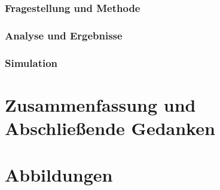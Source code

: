 \documentclass[openany,twoside,twocolumn]{book}
\let\pby\printbibliography
\renewcommand{\printbibliography}{}
\begin{document}
\hypertarget{fragestellung-und-methode-1}{%
\subsection{Fragestellung und
Methode}\label{fragestellung-und-methode-1}}

\hypertarget{analyse-und-ergebnisse-1}{%
\subsection{Analyse und Ergebnisse}\label{analyse-und-ergebnisse-1}}

\hypertarget{simulation-2}{%
\subsection{Simulation}\label{simulation-2}}

\pby[title={Literatur},segment=\therefsegment,heading=subbibintoc]

\hypertarget{zusammenfassung-und-abschlieende-gedanken}{%
\chapter{Zusammenfassung und Abschließende
Gedanken}\label{zusammenfassung-und-abschlieende-gedanken}}

\hypertarget{abbildungen}{%
\chapter{Abbildungen}\label{abbildungen}}

\printbibliography
\end{document}
